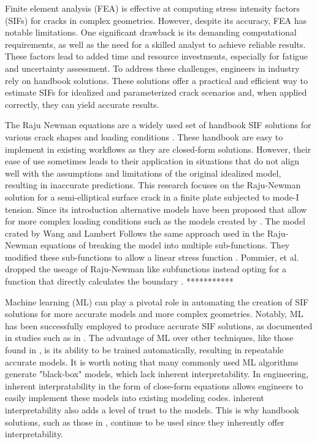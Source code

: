 Finite element analysis (FEA) is effective at computing stress intensity factors (SIFs) for cracks in complex geometries. However, despite its accuracy, FEA has notable limitations. One significant drawback is its demanding computational requirements, as well as the need for a skilled analyst to achieve reliable results. These factors lead to added time and resource investments, especially for fatigue and uncertainty assessment. To address these challenges, engineers in industry rely on handbook solutions. These solutions offer a practical and efficient way to estimate SIFs for idealized and parameterized crack scenarios and, when applied correctly, they can yield accurate results.


The Raju Newman equations are a widely used set of handbook SIF solutions for various crack shapes and loading conditions \cite{RNeqnsbook}. These handbook are easy to implement in existing workflows as they are closed-form solutions. However, their ease of use sometimes leads to their application in situations that do not align well with the assumptions and limitations of the original idealized model, resulting in inaccurate predictions. This research focuses on the Raju-Newman solution for a semi-elliptical surface crack in a finite plate subjected to mode-I tension. Since its introduction alternative models have been proposed that allow for more complex loading conditions such as the models created by \cite{Wang1995, Pommier1999}. The model crated by Wang and Lambert Follows the same approach used in the Raju-Newman equations of breaking the model into multiple sub-functions. They modified these sub-functions to allow a linear stress function \cite{Wang1995}. Pommier, et al. dropped the useage of Raju-Newman like subfunctions instead opting for a function that directly calculates the boundary  \cite{Pommier1999}. ***********

Machine learning (ML) can play a pivotal role in automating the creation of SIF solutions for more accurate models and more complex geometries. Notably, ML has been successfully employed to produce accurate SIF solutions, as documented in studies such as in \cite{Zhang2023, Sobotka2022, Keprate2017, Xu2022, Seghier2020}. The advantage of ML over other techniques, like those found in \cite{RNeqnsbook, Pommier1999, Wang1995}, is its ability to be trained automatically, resulting in repeatable accurate models. It is worth noting that many commonly used ML algorithms generate "black-box" models, which lack inherent interpretability. In engineering, inherent interpratability in the form of close-form equations allows engineers to easily implement these models into existing modeling codes. inherent interpretability also adds a level of trust to the models. This is why handbook solutions, such as those in \cite{RNeqnsbook}, continue to be used since they inherently offer interpretability. 

